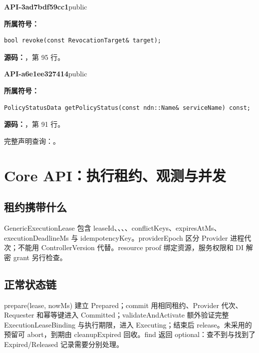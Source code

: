 \textbf{API-3ad7bdf59cc1}\quad public\par
\textbf{所属符号：}\par
\begin{Verbatim}[fontsize=\footnotesize,breaklines,breakanywhere]
bool revoke(const RevocationTarget& target);
\end{Verbatim}
\textbf{源码：}，第 95 行。\par

\textbf{API-a6e1ee327414}\quad public\par
\textbf{所属符号：}\par
\begin{Verbatim}[fontsize=\footnotesize,breaklines,breakanywhere]
PolicyStatusData getPolicyStatus(const ndn::Name& serviceName) const;
\end{Verbatim}
\textbf{源码：}，第 91 行。\par

完整声明查询：。

\section{Core API：执行租约、观测与并发}

\subsection{租约携带什么}
GenericExecutionLease 包含 leaseId、、、、conflictKeys、expiresAtMs、executionDeadlineMs 与 idempotencyKey。providerEpoch 区分 Provider 进程代次；不能用 ControllerVersion 代替。resource proof 绑定资源，服务权限和 DI 解密 grant 另行检查。

\subsection{正常状态链}
prepare(lease, nowMs) 建立 Prepared；commit 用相同租约、Provider 代次、Requester 和幂等键进入 Committed；validateAndActivate 额外验证完整 ExecutionLeaseBinding 与执行期限，进入 Executing；结束后 release。未采用的预留可 abort，到期由 cleanupExpired 回收。find 返回 optional：查不到与找到了 Expired/Released 记录需要分别处理。


